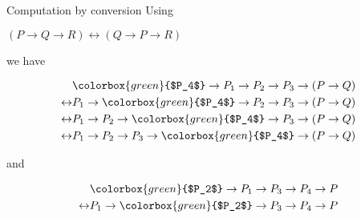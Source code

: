 \documentclass[presentation]{beamer}
\begin{document}
\begin{frame}[label={sec:orgheadline22}]{Computation by conversion}
Using 

\begin{center}
\((P \rightarrow Q \rightarrow R) \leftrightarrow (Q \rightarrow P \rightarrow R)\)
\end{center}

we have

\begin{align*}
                  &\colorbox{green}{$P_4$} \rightarrow P_1 \rightarrow P_2 \rightarrow P_3 \rightarrow (P \rightarrow Q)\\
  \leftrightarrow &P_1 \rightarrow \colorbox{green}{$P_4$} \rightarrow P_2 \rightarrow P_3 \rightarrow (P \rightarrow Q)\\
  \leftrightarrow &P_1 \rightarrow P_2 \rightarrow \colorbox{green}{$P_4$} \rightarrow P_3 \rightarrow (P \rightarrow Q)\\
  \leftrightarrow &P_1 \rightarrow P_2 \rightarrow P_3 \rightarrow \colorbox{green}{$P_4$} \rightarrow (P \rightarrow Q)
\end{align*}

and

\begin{align*}
                  &\colorbox{green}{$P_2$} \rightarrow P_1 \rightarrow P_3 \rightarrow P_4 \rightarrow P\\
  \leftrightarrow &P_1 \rightarrow \colorbox{green}{$P_2$} \rightarrow P_3 \rightarrow P_4 \rightarrow P
\end{align*}
\end{frame}
\end{document}
